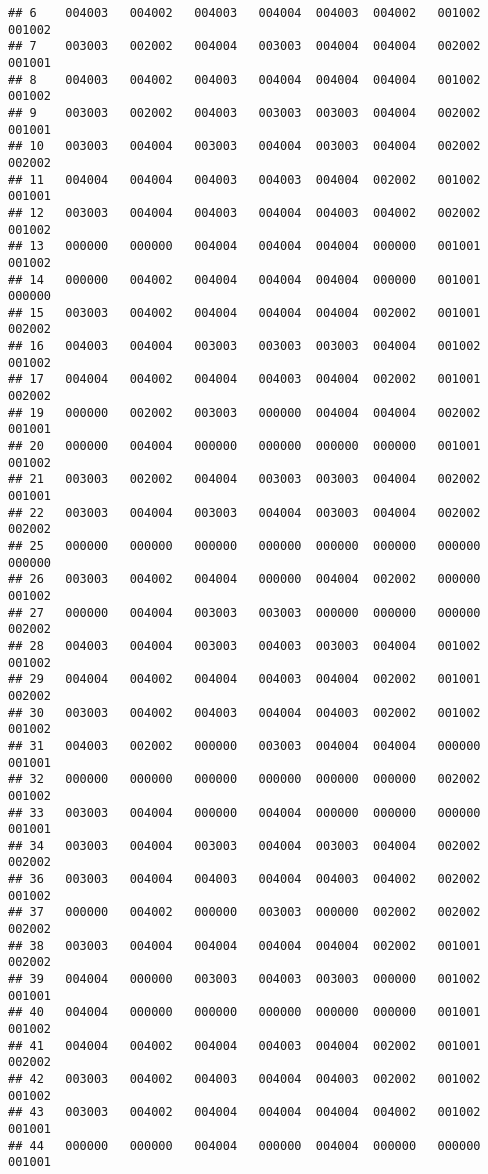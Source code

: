 \documentclass[
]{article}
\begin{document}
\begin{verbatim}
## 6    004003   004002   004003   004004  004003  004002   001002   001002
## 7    003003   002002   004004   003003  004004  004004   002002   001001
## 8    004003   004002   004003   004004  004004  004004   001002   001002
## 9    003003   002002   004003   003003  003003  004004   002002   001001
## 10   003003   004004   003003   004004  003003  004004   002002   002002
## 11   004004   004004   004003   004003  004004  002002   001002   001001
## 12   003003   004004   004003   004004  004003  004002   002002   001002
## 13   000000   000000   004004   004004  004004  000000   001001   001002
## 14   000000   004002   004004   004004  004004  000000   001001   000000
## 15   003003   004002   004004   004004  004004  002002   001001   002002
## 16   004003   004004   003003   003003  003003  004004   001002   001002
## 17   004004   004002   004004   004003  004004  002002   001001   002002
## 19   000000   002002   003003   000000  004004  004004   002002   001001
## 20   000000   004004   000000   000000  000000  000000   001001   001002
## 21   003003   002002   004004   003003  003003  004004   002002   001001
## 22   003003   004004   003003   004004  003003  004004   002002   002002
## 25   000000   000000   000000   000000  000000  000000   000000   000000
## 26   003003   004002   004004   000000  004004  002002   000000   001002
## 27   000000   004004   003003   003003  000000  000000   000000   002002
## 28   004003   004004   003003   004003  003003  004004   001002   001002
## 29   004004   004002   004004   004003  004004  002002   001001   002002
## 30   003003   004002   004003   004004  004003  002002   001002   001002
## 31   004003   002002   000000   003003  004004  004004   000000   001001
## 32   000000   000000   000000   000000  000000  000000   002002   001002
## 33   003003   004004   000000   004004  000000  000000   000000   001001
## 34   003003   004004   003003   004004  003003  004004   002002   002002
## 36   003003   004004   004003   004004  004003  004002   002002   001002
## 37   000000   004002   000000   003003  000000  002002   002002   002002
## 38   003003   004004   004004   004004  004004  002002   001001   002002
## 39   004004   000000   003003   004003  003003  000000   001002   001001
## 40   004004   000000   000000   000000  000000  000000   001001   001002
## 41   004004   004002   004004   004003  004004  002002   001001   002002
## 42   003003   004002   004003   004004  004003  002002   001002   001002
## 43   003003   004002   004004   004004  004004  004002   001002   001001
## 44   000000   000000   004004   000000  004004  000000   000000   001001

\end{verbatim}
\end{document}
